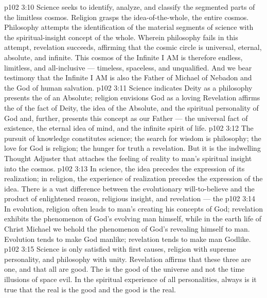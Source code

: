 \vs p102 3:10 \pc Science seeks to identify, analyze, and classify the segmented parts of the limitless cosmos. Religion grasps the idea\hyp{}of\hyp{}the\hyp{}whole, the entire cosmos. Philosophy attempts the identification of the material segments of science with the spiritual\hyp{}insight concept of the whole. Wherein philosophy fails in this attempt, revelation succeeds, affirming that the cosmic circle is universal, eternal, absolute, and infinite. This cosmos of the Infinite I AM is therefore endless, limitless, and all\hyp{}inclusive --- timeless, spaceless, and unqualified. And we bear testimony that the Infinite I AM is also the Father of Michael of Nebadon and the God of human salvation.
\vs p102 3:11 Science indicates Deity as a  philosophy presents the  of an Absolute; religion envisions God as a loving  Revelation affirms the  of the fact of Deity, the idea of the Absolute, and the spiritual personality of God and, further, presents this concept as our Father --- the universal fact of existence, the eternal idea of mind, and the infinite spirit of life.
\vs p102 3:12 The pursuit of knowledge constitutes science; the search for wisdom is philosophy; the love for God is religion; the hunger for truth  a revelation. But it is the indwelling Thought Adjuster that attaches the feeling of reality to man’s spiritual insight into the cosmos.
\vs p102 3:13 \pc In science, the idea precedes the expression of its realization; in religion, the experience of realization precedes the expression of the idea. There is a vast difference between the evolutionary will\hyp{}to\hyp{}believe and the product of enlightened reason, religious insight, and revelation --- the 
\vs p102 3:14 In evolution, religion often leads to man’s creating his concepts of God; revelation exhibits the phenomenon of God’s evolving man himself, while in the earth life of Christ Michael we behold the phenomenon of God’s revealing himself to man. Evolution tends to make God manlike; revelation tends to make man Godlike.
\vs p102 3:15 Science is only satisfied with first causes, religion with supreme personality, and philosophy with unity. Revelation affirms that these three are one, and that all are good. The  is the good of the universe and not the time illusions of space evil. In the spiritual experience of all personalities, always is it true that the real is the good and the good is the real.
